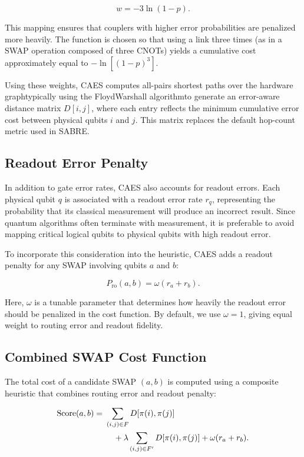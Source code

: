 \documentclass[conference]{IEEEtran}
\begin{document}
\[
    w = -3 \ln(1 - p).
\]

This mapping ensures that couplers with higher error probabilities are penalized more heavily. The function is chosen so that using a link three times (as in a SWAP operation composed of three CNOTs) yields a cumulative cost approximately equal to $-\ln[(1 - p)^3]$.

Using these weights, CAES computes all-pairs shortest paths over the hardware graph\textemdash typically using the Floyd\textendash Warshall algorithm\textemdash to generate an error-aware distance matrix $D[i,j]$, where each entry reflects the minimum cumulative error cost between physical qubits $i$ and $j$. This matrix replaces the default hop-count metric used in SABRE.

\subsection{Readout Error Penalty}

In addition to gate error rates, CAES also accounts for readout errors. Each physical qubit $q$ is associated with a readout error rate $r_q$, representing the probability that its classical measurement will produce an incorrect result. Since quantum algorithms often terminate with measurement, it is preferable to avoid mapping critical logical qubits to physical qubits with high readout error.

To incorporate this consideration into the heuristic, CAES adds a readout penalty for any SWAP involving qubits $a$ and $b$:

\[
    P_{\text{ro}}(a, b) = \omega (r_a + r_b).
\]

Here, $\omega$ is a tunable parameter that determines how heavily the readout error should be penalized in the cost function. By default, we use $\omega = 1$, giving equal weight to routing error and readout fidelity.

\subsection{Combined SWAP Cost Function}

The total cost of a candidate SWAP $(a, b)$ is computed using a composite heuristic that combines routing error and readout penalty:

\begin{align}
    \mathrm{Score}(a, b) =\ & \sum_{(i, j) \in F} D[\pi(i), \pi(j)] \notag \\
    &\quad + \lambda \sum_{(i, j) \in F'} D[\pi(i), \pi(j)] + \omega(r_a + r_b).
\end{align}
\end{document}
